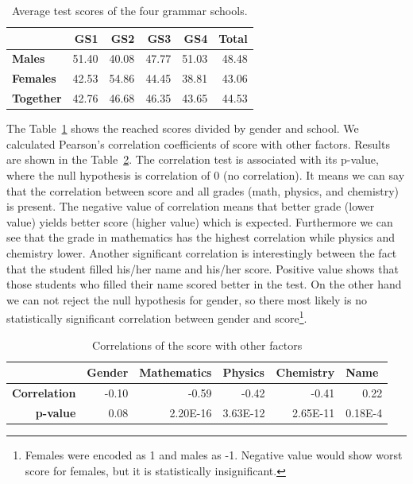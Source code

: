 \begin{table}[htbp]
  \centering
  \caption{Average test scores of the four grammar schools.}
	
	\vspace{3mm}
	
    \begin{tabular}{l|rrrr|r|}
		\hline
    &\textbf{GS1}   & \textbf{GS2} & \textbf{GS3} & \textbf{GS4} & \textbf{Total} \\
					\hline    
    \textbf{Males} & 51.40  & 40.08 & 47.77 & 51.03 & 48.48 \\
    \textbf{Females} & 42.53 & 54.86 & 44.45 & 38.81 & 43.06 \\
		\textbf{Together}&42.76 & 46.68 & 46.35 & 43.65 & 44.53 \\
		\hline
    \end{tabular}%
  \label{tab:totals}%
\end{table}%

The Table~\ref{tab:totals} shows the reached scores divided by gender and school. We calculated Pearson's correlation coefficients of score with other factors. Results are shown in the Table~\ref{tab:corr1}. The correlation test is associated with its p-value, where the null hypothesis is correlation of 0 (no correlation). It means we can say that the correlation between score and all grades (math, physics, and chemistry) is present. The negative value of correlation means that better grade (lower value) yields better score (higher value) which is expected. Furthermore we can see that the grade in mathematics has the highest correlation while physics and chemistry lower. Another significant correlation is interestingly between the fact that the student filled his/her name and his/her score. Positive value shows that those students who filled their name scored better in the test.
On the other hand we can not reject the null hypothesis for gender, so there most likely is no statistically significant correlation between gender and score\footnote{Females were encoded as 1 and males as -1. Negative value would show worst score for females, but it is statistically insignificant.}.

\begin{table}[htbp]%
\caption{Correlations of the score with other factors}
\label{tab:corr1}
\begin{center}
    \begin{tabular}{rrrrrr}
    \hline
    \multicolumn{1}{l}{\textbf{}}  & \multicolumn{1}{l}{\textbf{Gender}} & \multicolumn{1}{l}{\textbf{Mathematics}} & \multicolumn{1}{l}{\textbf{Physics}} & \multicolumn{1}{l}{\textbf{Chemistry}}& \multicolumn{1}{l}{\textbf{Name}} \\
    \hline
    \textbf{Correlation}&  -0.10  & -0.59  & -0.42  & -0.41  & 0.22\\
		\textbf{p-value}&  0.08  & 2.20E-16  & 3.63E-12 & 2.65E-11 & 0.18E-4 \\
    \hline
    \end{tabular}%
\end{center}
\end{table}

